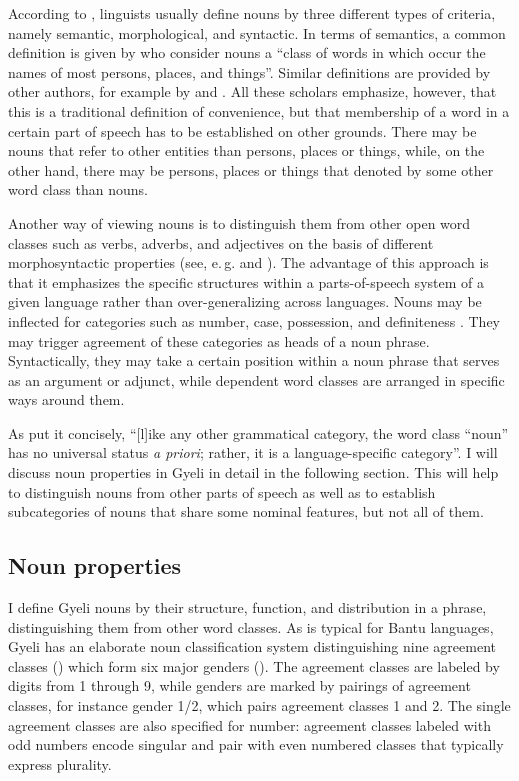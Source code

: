 According to \citet[708]{evans2000}, linguists usually define nouns by three different types of criteria, namely semantic, morphological, and syntactic.
In terms of semantics, a common definition is given by \citet[5]{schachter2007} who consider nouns a ``class of words in which occur the names of most persons, places, and things''. Similar definitions are provided by other authors, for example by \citet[720]{tamm2006} and \citet[710]{evans2000}. All these scholars emphasize, however, that this is a traditional definition of convenience, but that membership of a word in a certain part of speech has to be established on other grounds. There may be nouns that refer to other entities than persons, places or things, while, on the other hand, there may be persons, places or things that denoted by some other word class than nouns. 

Another way of viewing nouns is to distinguish them from other open word classes such as verbs, adverbs, and adjectives on the basis of different morphosyntactic properties  (see,
e.\,g. \citealt{bhat2000} and \citealt{baker2003}). The advantage of this approach is that it emphasizes the specific structures within a parts-of-speech system of a given language rather than over-generalizing across languages. Nouns may be inflected for categories such as number, case, possession, and definiteness \citep[722]{tamm2006}. They may trigger agreement of these categories as heads of a noun phrase. Syntactically, they may take a certain position within a noun phrase that serves as an argument or adjunct, while dependent word classes are arranged in specific ways around them.

As \citet[733]{lehmann2000}  put it concisely, ``[l]ike any other grammatical category, the word class ``noun'' has no universal status {\itshape a priori}; rather, it is a language-specific category''. I will discuss noun properties in Gyeli in detail in the following section. This will help to distinguish nouns from other parts of speech as well as to establish subcategories of nouns that share some nominal features, but not all of them.


\subsection{Noun properties}
\label{sec:Nprop}

I define Gyeli nouns by their structure, function, and distribution in a phrase, distinguishing them from other word classes. As is typical for Bantu languages, Gyeli has an elaborate noun classification system distinguishing nine agreement classes () which form six major genders (). The agreement classes are labeled by digits from 1 through 9, while genders are marked by pairings of agreement classes, for instance gender 1/2, which pairs agreement classes 1 and 2.  The single agreement classes are also specified for number: agreement classes labeled with odd numbers encode singular and pair with even numbered classes that typically express plurality. 

